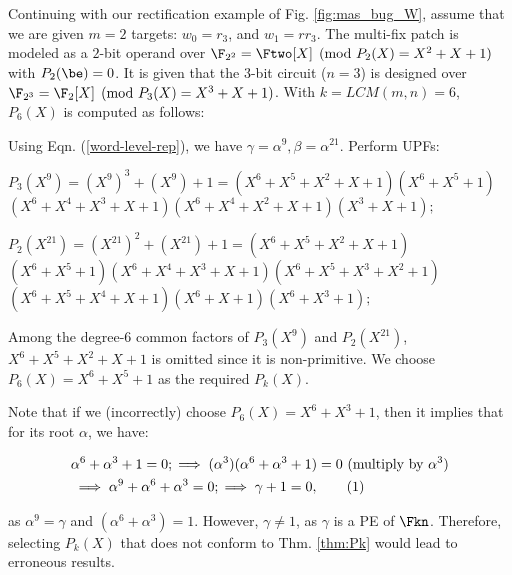 \begin{Example}

\label{composite_ex}
Continuing with our rectification example of Fig. \ref{fig:mas_bug_W},
assume that we are given $m=2$ targets: $w_0=r_3$, and $w_1=rr_3$.
The multi-fix patch is modeled as a $2$-bit
operand over $\F_{2^2}=\Ftwo[X]\pmod{P_2(X)=X^2+X+1}$ with
$P_2(\be)=0$. It is given that the 3-bit circuit ($n=3$) is designed
over {\small $\F_{2^3}=\F_2[X]\pmod{P_3(X)=X^3+X+1}$}.  
With $k=LCM(m,n)=6$, $P_6(X)$ is computed as follows:

Using Eqn. (\ref{word-level-rep}), we have $\gamma=\alpha^9,\beta=\alpha^{21}$. Perform UPFs:
\bi
\item ${\scriptstyle P_3(X^9) = (X^9)^3+(X^9)+1 =
  (X^6+X^5+X^2+X+1)(X^6+X^5+1)}$\\${\scriptstyle(X^6+X^4+X^3+X+1)(X^6+X^4+X^2+X+1)(X^3+X+1);}$
\item ${\scriptstyle P_2(X^{21}) = (X^{21})^2+(X^{21})+1 =
  (X^6+X^5+X^2+X+1)}$\\${\scriptstyle (X^6+X^5+1)(X^6+X^4+X^3+X+1)(X^6+X^5+X^3+X^2+1)
  }$\\${\scriptstyle(X^6+X^5+X^4+X+1)(X^6+X+1)(X^6+X^3+1);}$
\ei

Among the degree-6 common factors of ${\scriptstyle P_3(X^9)}$ and
${\scriptstyle P_2(X^{21})}$,  ${\scriptstyle X^6+X^5+X^2+X+1}$ is omitted
since it is non-primitive.  We choose ${\scriptstyle P_6(X) =
  X^6+X^5+1}$ as the required $P_k(X)$. 

Note that if we (incorrectly) choose ${\scriptstyle P_6(X)=X^6 + X^3 +1}$, then it
implies that for its root $\alpha$, we have:

\vspace{-0.2in}
\begin{small}
\begin{align*}
&\alpha^6 + \alpha^3 + 1 = 0; \implies (\alpha^3)(\alpha^6 +
\alpha^3 + 1) = 0 ~(\text{multiply by}~\alpha^3)\\
&\implies \alpha^9 + \alpha^6 + \alpha^3 = 0; \implies \gamma + 1 = 0,
\stepcounter{equation}\tag{\theequation}\label{ll} 
\end{align*}
\end{small}
\vspace{-0.2in}

as $\alpha^9 = \gamma$ and $(\alpha^6 + \alpha^3) = 1$. However,
$\gamma \neq 1$, as $\gamma$ is a PE of $\Fkn$. Therefore, selecting
$P_k(X)$ that does not conform to Thm. \ref{thm:Pk} would lead to
erroneous results.
\end{Example}
\vspace{-0.15in}
